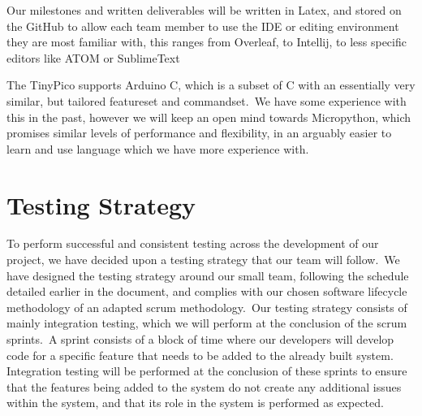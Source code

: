             Our milestones and written deliverables will be written in Latex, and stored on the GitHub to allow each
            team member to use the IDE or editing environment they are most familiar with, this ranges from Overleaf, to
            Intellij, to less specific editors like ATOM or SublimeText

            The TinyPico supports Arduino C, which is a subset of C with an essentially very similar, but tailored
            featureset and commandset.\ We have some experience with this in the past, however we will keep an open mind
            towards Micropython, which promises similar levels of performance and flexibility, in an arguably easier to
            learn and use language which we have more experience with.

    \section{Testing Strategy}
        To perform successful and consistent testing across the development of our project, we have decided upon a
        testing strategy that our team will follow.\ We have designed the testing strategy around our small team,
        following the schedule detailed earlier in the document, and complies with our chosen software lifecycle
        methodology of an adapted scrum methodology.\ Our testing strategy consists of mainly integration testing, which
        we will perform at the conclusion of the scrum sprints.\ A sprint consists of a block of time where our
        developers will develop code for a specific feature that needs to be added to the already built system.
        Integration testing will be performed at the conclusion of these sprints to ensure that the features being added
        to the system do not create any additional issues within the system, and that its role in the system is performed
        as expected.

